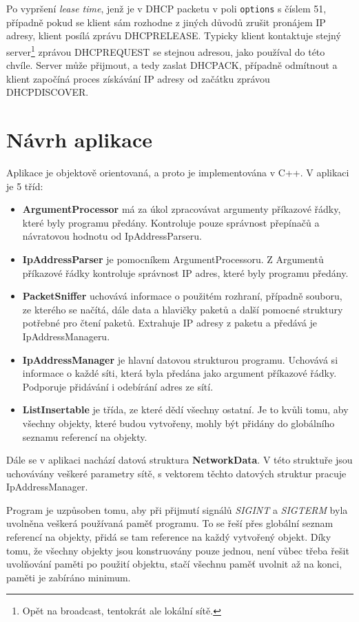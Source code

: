 \documentclass[a4paper, 11pt, hidelinks]{article}
\begin{document}
Po vypršení \emph{lease time}, jenž je v DHCP packetu v poli \texttt{options} s číslem 51, případně pokud se klient sám rozhodne z jiných důvodů zrušit pronájem IP adresy, klient posílá zprávu DHCPRELEASE.
Typicky klient kontaktuje stejný server\footnote[5]{Opět na broadcast, tentokrát ale lokální sítě.} zprávou DHCPREQUEST se stejnou adresou, jako používal do této chvíle.
Server může přijmout, a tedy zaslat DHCPACK, případně odmítnout a klient započíná proces získávání IP adresy od začátku zprávou DHCPDISCOVER.
\section{Návrh aplikace}\label{2_navrh}
Aplikace je objektově orientovaná, a proto je implementována v C++.
V aplikaci je 5 tříd:
\begin{itemize}
    \item \textbf{ArgumentProcessor} má za úkol zpracovávat argumenty příkazové řádky, které byly programu předány. Kontroluje pouze správnost přepínačů a návratovou hodnotu od IpAddressParseru.
    \item \textbf{IpAddressParser} je pomocníkem ArgumentProcessoru. Z Argumentů příkazové řádky kontroluje správnost IP adres, které byly programu předány. 
    \item \textbf{PacketSniffer} uchovává informace o použitém rozhraní, případně souboru, ze kterého se načítá, dále data a hlavičky paketů a další pomocné struktury potřebné pro čtení paketů.
    Extrahuje IP adresy z paketu a předává je IpAddressManageru.
    \item \textbf{IpAddressManager} je hlavní datovou strukturou programu.
    Uchovává si informace o každé síti, která byla předána jako argument příkazové řádky. 
    Podporuje přidávání i odebírání adres ze sítí.
    \item \textbf{ListInsertable} je třída, ze které dědí všechny ostatní. 
    Je to kvůli tomu, aby všechny objekty, které budou vytvořeny, mohly být přidány do globálního seznamu referencí na objekty.
\end{itemize}\newpage
Dále se v aplikaci nachází datová struktura \textbf{NetworkData}. 
V této struktuře jsou uchovávány veškeré parametry sítě, s vektorem těchto datových struktur pracuje IpAddressManager.

Program je uzpůsoben tomu, aby při přijmutí signálů \emph{SIGINT} a \emph{SIGTERM} byla uvolněna veškerá používaná paměť programu. 
To se řeší přes globální seznam referencí na objekty, přidá se tam reference na každý vytvořený objekt.
Díky tomu, že všechny objekty jsou konstruovány pouze jednou, není vůbec třeba řešit uvolňování paměti po použití objektu, stačí všechnu paměť uvolnit až na konci, paměti je zabíráno minimum.
\end{document}

